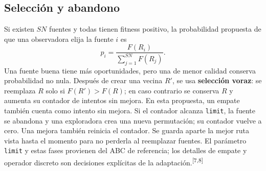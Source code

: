\documentclass[11pt,letterpaper]{article}
\newcommand{\src}[1]{\textsuperscript{\textcolor{cian}{[#1]}}}
\begin{document}
\subsection{Selección y abandono}
Si existen $SN$ fuentes y todas tienen fitness positivo, la probabilidad propuesta de que una observadora elija la fuente $i$ es
\begin{equation}
p_i=\frac{F(R_i)}{\sum_{j=1}^{SN}F(R_j)}.\label{eq:ruleta}
\end{equation}
Una fuente buena tiene más oportunidades, pero una de menor calidad conserva probabilidad no nula. Después de crear una vecina $R'$, se usa \textbf{selección voraz}: se reemplaza $R$ solo si $F(R')>F(R)$; en caso contrario se conserva $R$ y aumenta su contador de intentos sin mejora. En esta propuesta, un empate también cuenta como intento sin mejora. Si el contador alcanza \texttt{limit}, la fuente se abandona y una exploradora crea una nueva permutación; su contador vuelve a cero. Una mejora también reinicia el contador. Se guarda aparte la mejor ruta vista hasta el momento para no perderla al reemplazar fuentes. El parámetro \texttt{limit} y estas fases provienen del ABC de referencia; los detalles de empate y operador discreto son decisiones explícitas de la adaptación.\src{7,8}
\end{document}
